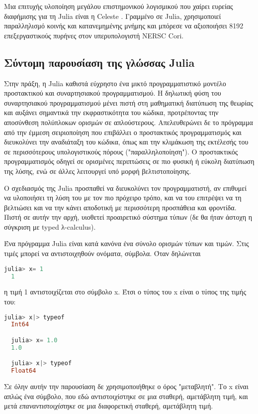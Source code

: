   Μια επιτυχής υλοποίηση μεγάλου επιστημονικού λογισμικού που χαίρει ευρείας διαφήμισης για τη Julia είναι η Celeste \cite{regierLearningAstronomicalCatalog2016}.
  Γραμμένο σε Julia, χρησιμοποιεί παραλληλισμό κοινής και κατανεμημένης μνήμης και μπόρεσε να αξιοποιήσει
  8192 επεξεργαστικούς πυρήνες στον υπερυπολογιστή NERSC Cori.

\subsection{Σύντομη παρουσίαση της γλώσσας Julia}

  Στην πράξη, η Julia καθιστά εύχρηστο ένα μικτό προγραμματιστικό μοντέλο προστακτικού και συναρτησιακού προγραμματισμού.
  Η δηλωτική φύση του συναρτησιακού προγραμματισμού μένει πιστή στη μαθηματική διατύπωση της θεωρίας και αυξάνει σημαντικά την εκφραστικότητα του κώδικα,
  προτρέποντας την αποσύνθεση πολύπλοκων ορισμών σε απλούστερους.
  Απελευθερώνει δε το πρόγραμμα από την έμμεση σειριοποίηση που επιβάλλει ο προστακτικός προγραμματισμός και διευκολύνει την αναδιάταξη του κώδικα,
  όπως και την κλιμάκωση της εκτέλεσής του σε περισσότερους υπολογιστικούς πόρους ("παραλληλοποίηση").
  Ο προστακτικός προγραμματισμός οδηγεί σε ορισμένες περιπτώσεις σε πιο φυσική ή εύκολη διατύπωση της λύσης, ενώ σε άλλες λειτουργεί υπό μορφή βελτιστοποίησης.

  Ο σχεδιασμός της Julia προσπαθεί να διευκολύνει τον προγραμματιστή, αν επιθυμεί να υλοποιήσει τη λύση του με τον πιο πρόχειρο τρόπο,
  και να του επιτρέψει να τη βελτιώσει και να την κάνει αποδοτική με περισσότερη προσπάθεια και φροντίδα.
  Πιστή σε αυτήν την αρχή, υιοθετεί προαιρετικό σύστημα τύπων (δε θα ήταν άστοχη η σύγκριση με typed λ-calculus).

  Ένα πρόγραμμα Julia είναι κατά κανόνα ένα σύνολο ορισμών τύπων και τιμών. Στις τιμές μπορεί να αντιστοιχηθούν ονόματα, σύμβολα. Όταν δηλώνεται
  \begin{lstlisting}[language=julia]
  julia> x= 1
  1
  \end{lstlisting}
  η τιμή 1 αντιστοιχίζεται στο σύμβολο x.
  Έτσι ο τύπος του x είναι ο τύπος της τιμής του:
  \begin{lstlisting}[language=julia]
  julia> x|> typeof
  Int64

  julia> x= 1.0
  1.0

  julia> x|> typeof
  Float64
  \end{lstlisting}
  Σε όλην αυτήν την παρουσίαση δε χρησιμοποιήθηκε ο όρος "μεταβλητή". Το x είναι απλώς ένα σύμβολο, που εδώ αντιστοιχίστηκε σε μια σταθερή, αμετάβλητη τιμή,
  και μετά \textit{επαναντιστοιχίστηκε} σε μια διαφορετική σταθερή, αμετάβλητη τιμή.

